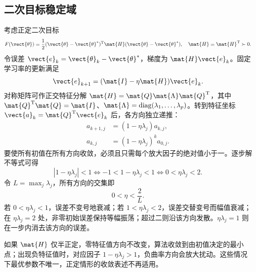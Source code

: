\documentclass[../textbook.tex]{subfiles}
\begin{document}
\subsection{二次目标稳定域}
考虑正定二次目标
\begin{equation}
 F(\vect{\theta})=\frac12(\vect{\theta}-\vect{\theta}^*)^{\mathrm{T}} \mat{H}(\vect{\theta}-\vect{\theta}^*),
 \quad \mat{H}=\mat{H}^{\mathrm{T}}\succ0.
\end{equation}
令误差 $\vect{e}_k=\vect{\theta}_k-\vect{\theta}^*$，梯度为 $\mat{H}\vect{e}_k$。固定学习率的更新满足
\begin{equation}
 \vect{e}_{k+1}=(\mat{I}-\eta \mat{H})\vect{e}_k.
\end{equation}
对称矩阵可作正交特征分解 $\mat{H}=\mat{Q}\mat{\Lambda} \mat{Q}^{\mathrm{T}}$，其中 $\mat{Q}^{\mathrm{T}}\mat{Q}=\mat{I}$、$\mat{\Lambda}=\operatorname{diag}(\lambda_1,\ldots,\lambda_p)$。转到特征坐标 $\vect{a}_k=\mat{Q}^{\mathrm{T}}\vect{e}_k$ 后，各方向独立递推：
\begin{equation}\label{eq:opt-spectral}
\begin{aligned}
 a_{k+1,j} &= (1-\eta\lambda_j)a_{k,j}, \\
 a_{k,j} &= (1-\eta\lambda_j)^k a_{0,j}.
\end{aligned}
\end{equation}
要使所有初值在所有方向收敛，必须且只需每个放大因子的绝对值小于一。逐步解不等式可得
\begin{equation}
 |1-\eta\lambda_j|<1
 \iff -1<1-\eta\lambda_j<1
 \iff 0<\eta\lambda_j<2.
\end{equation}
令 $L=\max_j\lambda_j$，所有方向的交集即
\begin{equation}
 \boxed{\quad 0<\eta<\frac2L.\quad}\label{eq:opt-stability}
\end{equation}
若 $0<\eta\lambda_j<1$，误差不变号地衰减；若 $1<\eta\lambda_j<2$，误差交替变号而幅值衰减；在 $\eta\lambda_j=2$ 处，非零初始误差保持等幅振荡；超过二则沿该方向发散。$\eta\lambda_j=1$ 则在一步内消去该方向的误差。

如果 $\mat{H}$ 仅半正定，零特征值方向不改变，算法收敛到由初值决定的最小点；出现负特征值时，对应因子 $1-\eta\lambda_j>1$，负曲率方向会放大扰动。这些情况下最优参数不唯一，正定情形的收敛表述不再适用。
\end{document}
